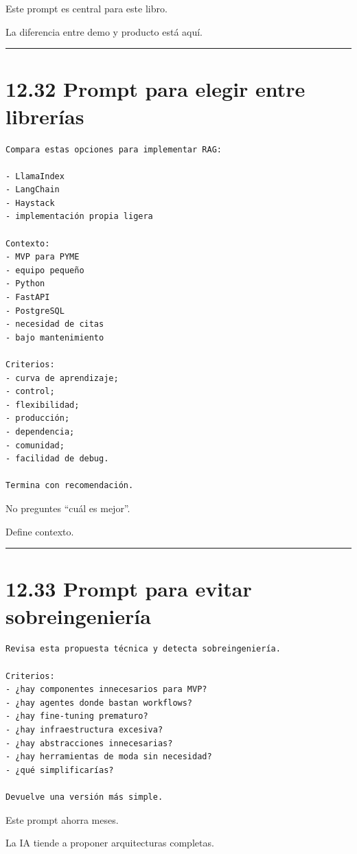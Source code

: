 Este prompt es central para este libro.

La diferencia entre demo y producto está aquí.

\begin{center}\rule{0.5\linewidth}{0.5pt}\end{center}

\section{12.32 Prompt para elegir entre
librerías}\label{prompt-para-elegir-entre-libreruxedas}

\begin{lstlisting}
Compara estas opciones para implementar RAG:

- LlamaIndex
- LangChain
- Haystack
- implementación propia ligera

Contexto:
- MVP para PYME
- equipo pequeño
- Python
- FastAPI
- PostgreSQL
- necesidad de citas
- bajo mantenimiento

Criterios:
- curva de aprendizaje;
- control;
- flexibilidad;
- producción;
- dependencia;
- comunidad;
- facilidad de debug.

Termina con recomendación.
\end{lstlisting}

No preguntes ``cuál es mejor''.

Define contexto.

\begin{center}\rule{0.5\linewidth}{0.5pt}\end{center}

\section{12.33 Prompt para evitar
sobreingeniería}\label{prompt-para-evitar-sobreingenieruxeda}

\begin{lstlisting}
Revisa esta propuesta técnica y detecta sobreingeniería.

Criterios:
- ¿hay componentes innecesarios para MVP?
- ¿hay agentes donde bastan workflows?
- ¿hay fine-tuning prematuro?
- ¿hay infraestructura excesiva?
- ¿hay abstracciones innecesarias?
- ¿hay herramientas de moda sin necesidad?
- ¿qué simplificarías?

Devuelve una versión más simple.
\end{lstlisting}

Este prompt ahorra meses.

La IA tiende a proponer arquitecturas completas.


